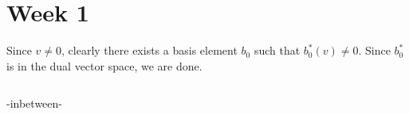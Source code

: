 \section*{Week 1}

Since $v \neq 0$, clearly there exists a basis element $b_0$ such that $b_0^{\ast}(v) \neq 0$. Since $b_0^{\ast}$ is in the dual vector space, we are done.

\(\newenvironment{ABC}{ABX_{\rm before}}{ABC_{\rm after}}\)

\begin{ABC}-inbetween-\end{ABC}
